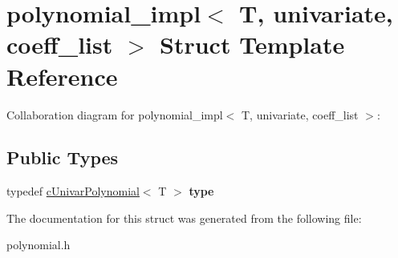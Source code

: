 \hypertarget{structpolynomial__impl_3_01T_00_01univariate_00_01coeff__list_01_4}{\section{polynomial\-\_\-impl$<$ T, univariate, coeff\-\_\-list $>$ Struct Template Reference}
\label{structpolynomial__impl_3_01T_00_01univariate_00_01coeff__list_01_4}
}


Collaboration diagram for polynomial\-\_\-impl$<$ T, univariate, coeff\-\_\-list $>$\-:
\subsection*{Public Types}
\begin{DoxyCompactItemize}
\item 
\hypertarget{structpolynomial__impl_3_01T_00_01univariate_00_01coeff__list_01_4_a5d69c607e978668acbf8085f3dd8559a}{typedef \hyperlink{classcUnivarPolynomial}{c\-Univar\-Polynomial}$<$ T $>$ {\bfseries type}}\label{structpolynomial__impl_3_01T_00_01univariate_00_01coeff__list_01_4_a5d69c607e978668acbf8085f3dd8559a}

\end{DoxyCompactItemize}


The documentation for this struct was generated from the following file\-:\begin{DoxyCompactItemize}
\item 
polynomial.\-h\end{DoxyCompactItemize}
